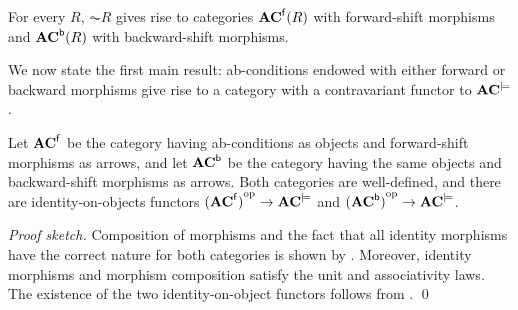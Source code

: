 %
\iffull
\begin{proposition}
For every $R$, $\AC R$ gives rise to categories $\mathbf{AC}^{\mathsf{f}}(R)$ with forward-shift morphisms and $\mathbf{AC}^{\mathsf{b}}(R)$ with backward-shift morphisms.
\end{proposition}
%
\fi
We now state the first main result: ab-conditions endowed with either forward or backward morphisms give rise to a category with a contravariant functor to $\mathbf{AC}^{\models}$.

\begin{theorem}
Let $\mathbf{AC}^{{\mathsf{f}}}$ be the category having ab-conditions as objects and forward-shift morphisms as arrows, and let $\mathbf{AC}^{{\mathsf{b}}}$ be the category having the same objects and backward-shift morphisms as arrows. Both categories are well-defined, and there are identity-on-objects functors ${(\mathbf{AC}^{{\mathsf{f}}})}^{\mathrm{op}} \rightarrow \mathbf{AC}^{\models}$ and ${(\mathbf{AC}^{{\mathsf{b}}})}^{\mathrm{op}} \rightarrow \mathbf{AC}^{\models}$.
\end{theorem}
%
\emph{Proof sketch.} Composition of morphisms and the fact that all identity morphisms have the correct nature for both categories is shown by .
Moreover, identity morphisms and morphism composition satisfy the unit and associativity laws. The existence of the two identity-on-object functors follows from .
\qed 

